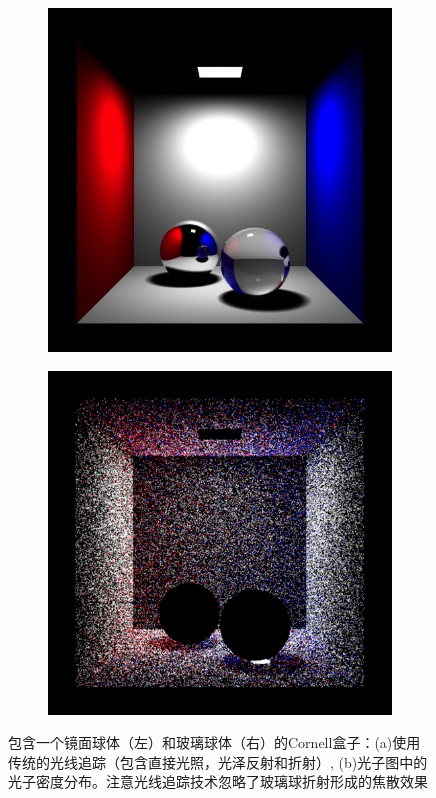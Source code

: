 \begin{figure}
\begin{center}
	\begin{subfigure}[b]{0.492\textwidth}
		\includegraphics[width=1.0\textwidth]{figures/pm/pm-2-1}
		\caption{}
	\end{subfigure}
	\begin{subfigure}[b]{0.492\textwidth}
		\includegraphics[width=1.0\textwidth]{figures/pm/pm-2-2}
		\caption{}
	\end{subfigure}
\end{center}
\caption{包含一个镜面球体（左）和玻璃球体（右）的Cornell盒子：(a)使用传统的光线追踪（包含直接光照，光泽反射和折射）, (b)光子图中的光子密度分布。注意光线追踪技术忽略了玻璃球折射形成的焦散效果}
\label{f:pm-photon-storing}
\end{figure}


